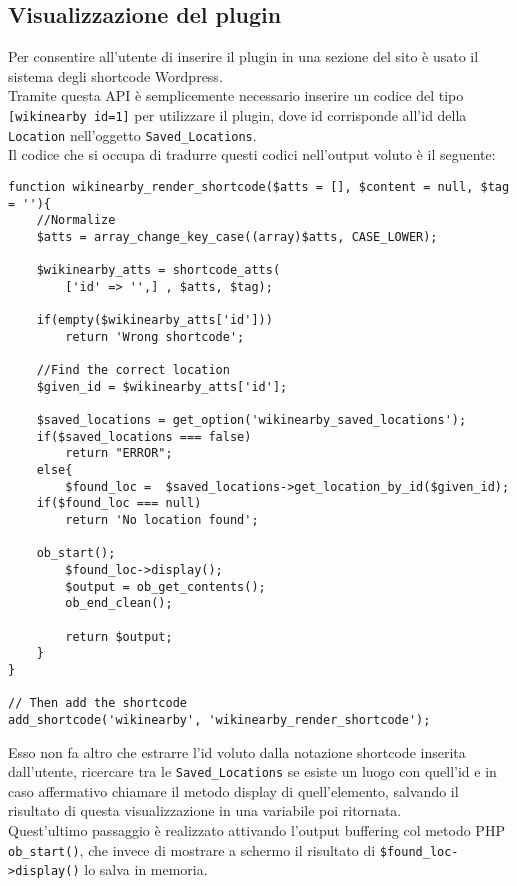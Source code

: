 \subsection*{Visualizzazione del plugin}
Per consentire all'utente di inserire il plugin in una sezione del sito è usato il sistema degli shortcode Wordpress\cite{shortcode}.\\
Tramite questa API è semplicemente necessario inserire un codice del tipo \texttt{[wikinearby id=1]} per utilizzare il plugin, dove id corrisponde all'id della \texttt{Location} nell'oggetto \texttt{Saved\_Locations}.\\
Il codice che si occupa di tradurre questi codici nell'output voluto è il seguente:\\
\begin{lstlisting}
function wikinearby_render_shortcode($atts = [], $content = null, $tag = ''){
    //Normalize
    $atts = array_change_key_case((array)$atts, CASE_LOWER);

    $wikinearby_atts = shortcode_atts(
        ['id' => '',] , $atts, $tag);
    
    if(empty($wikinearby_atts['id']))
        return 'Wrong shortcode';

    //Find the correct location
    $given_id = $wikinearby_atts['id'];

    $saved_locations = get_option('wikinearby_saved_locations');
    if($saved_locations === false)
        return "ERROR";
    else{
        $found_loc =  $saved_locations->get_location_by_id($given_id);
	if($found_loc === null)
		return 'No location found';
		
	ob_start(); 
        $found_loc->display();
        $output = ob_get_contents();
        ob_end_clean();
        
        return $output;
    }
}

// Then add the shortcode
add_shortcode('wikinearby', 'wikinearby_render_shortcode');
\end{lstlisting}
Esso non fa altro che estrarre l'id voluto dalla notazione shortcode inserita dall'utente, ricercare tra le \texttt{Saved\_Locations} se esiste un luogo con quell'id e in caso affermativo chiamare il metodo display di quell'elemento, salvando il risultato di questa visualizzazione in una variabile poi ritornata.\\
Quest'ultimo passaggio è realizzato attivando l'output buffering col metodo PHP \texttt{ob\_start()}, che invece di mostrare a schermo il risultato di \texttt{\$found\_loc->display()} lo salva in memoria.